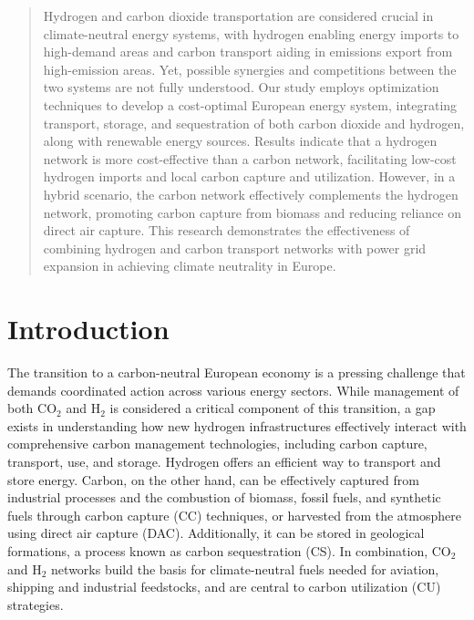 \documentclass[twocolumn]{article}
\newcommand{\carbon}{CO$_2$}
\newcommand{\hydrogen}{H$_2$}
\begin{document}
\begin{abstract}
    Hydrogen and carbon dioxide transportation are considered crucial in climate-neutral energy systems, with hydrogen enabling energy imports to high-demand areas and carbon transport aiding in emissions export from high-emission areas. Yet, possible synergies and competitions between the two systems are not fully understood. Our study employs optimization techniques to develop a cost-optimal European energy system, integrating transport, storage, and sequestration of both carbon dioxide and hydrogen, along with renewable energy sources. Results indicate that a hydrogen network is more cost-effective than a carbon network, facilitating low-cost hydrogen imports and local carbon capture and utilization. However, in a hybrid scenario, the carbon network effectively complements the hydrogen network, promoting carbon capture from biomass and reducing reliance on direct air capture. This research demonstrates the effectiveness of combining hydrogen and carbon transport networks with power grid expansion in achieving climate neutrality in Europe.
\end{abstract}


\section{Introduction}

The transition to a carbon-neutral European economy is a pressing challenge that demands coordinated action across various energy sectors. While management of both \carbon{} and \hydrogen{} is considered a critical component of this transition, a gap exists in understanding how new hydrogen infrastructures effectively interact with comprehensive carbon management technologies, including carbon capture, transport, use, and storage. Hydrogen offers an efficient way to transport and store energy. Carbon, on the other hand, can be effectively captured from industrial processes and the combustion of biomass, fossil fuels, and synthetic fuels through carbon capture (CC) techniques, or harvested from the atmosphere using direct air capture (DAC). Additionally, it can be stored in geological formations, a process known as carbon sequestration (CS). In combination, \carbon{} and \hydrogen{} networks build the basis for climate-neutral fuels needed for aviation, shipping and industrial feedstocks, and are central to carbon utilization (CU) strategies.
\end{document}

